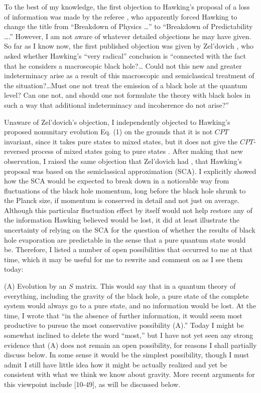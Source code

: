      To the best of my knowledge, the first objection to Hawking's
proposal
of a loss of information was made by the referee \cite{Hawpri}, who
apparently forced Hawking to change the title from ``Breakdown of
Physics \ldots '' to ``Breakdown of Predictability \ldots .''
However, I am
not aware of whatever detailed objections he may have given.  So far
as I
know now, the first published objection was given by Zel'dovich
\cite{Zel77b},
who asked whether Hawking's ``very radical'' conclusion is
``connected
with the fact that he considers a macroscopic black hole?\ldots
Could not
this new and greater indeterminacy arise as a result of this
macroscopic
and semiclassical treatment of the situation?\ldots  Must one not
treat
the emission of a black hole at the quantum level?  Can one not, and
should one not formulate the theory with black holes in such a way
that
additional indeterminacy and incoherence do not arise?''

     Unaware of Zel'dovich's objection, I independently objected to
Hawking's proposed nonunitary evolution Eq. (1) on the grounds that
it
is not $CPT$ invariant, since it takes
pure states to mixed states, but it does not give the $CPT$-reversed
process of
mixed states going to pure states \cite{Pag80}.  After making that
new
observation, I raised the same objection that Zel'dovich had
\cite{Zel77b},
that Hawking's proposal was based on the semiclassical approximation
(SCA).
I explicitly showed how the SCA
would be expected to break down in a noticeable way
from fluctuations of the black hole momentum, long before the black
hole shrunk
to the Planck size, if momentum is conserved in detail and not just
on average.
Although this particular fluctuation effect by itself would not help
restore
any of the information Hawking believed would be lost, it did at
least
illustrate the uncertainty of relying on the SCA for
the question of whether the results of black hole evaporation are
predictable
in the sense that a pure quantum state would be.  Therefore, I listed
a number
of open possibilities that occurred to me at that time, which it may
be useful
for me to rewrite and comment on as I see them today:

     (A) Evolution by an $S$ matrix.  This would say that in a
quantum theory
of everything, including the gravity of the black hole, a pure state
of the
complete system would always go to a pure state, and no information
would be
lost.  At the time, I wrote that ``in the absence of further
information, it
would seem most productive to pursue the most conservative
possibility (A).''
Today I might be somewhat inclined to delete the word ``most,'' but I
have not
yet seen any strong evidence that (A) does not remain an open
possibility, for
reasons I shall partially discuss below.  In some sense it would be
the
simplest possibility, though I must admit I still have little idea
how it might
be actually realized and yet be consistent with what we think we know
about
gravity.  More recent arguments for this viewpoint include
[10-49], as will be discussed below.


